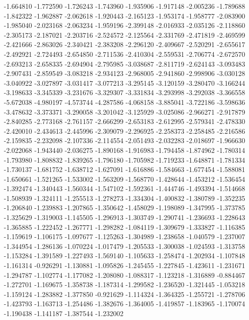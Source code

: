 -1.664810
-1.772590
-1.726243
-1.743960
-1.935906
-1.917148
-2.005236
-1.789688
-1.842322
-1.962887
-2.062618
-1.920443
-2.165123
-1.953174
-1.958777
-2.083900
-1.985040
-2.023168
-2.063234
-1.959196
-2.399148
-2.016933
-2.035126
-2.118860
-2.305173
-2.187021
-2.203716
-2.524572
-2.125564
-2.331769
-2.471819
-2.469599
-2.421666
-2.863026
-2.340421
-2.383208
-2.296120
-2.409667
-2.520291
-2.655617
-2.492921
-2.724493
-2.654850
-2.711536
-2.410304
-2.559531
-2.706774
-2.672570
-2.693213
-2.658335
-2.694904
-2.795985
-3.038687
-2.811719
-2.624143
-3.093483
-2.907431
-2.859549
-3.083218
-2.934123
-2.968005
-2.941860
-2.998906
-3.030128
-3.040922
-3.027897
-3.031417
-3.077213
-3.295145
-3.120159
-3.280470
-3.166244
-3.198633
-3.345339
-3.231676
-3.329307
-3.331834
-3.293998
-3.292038
-3.366558
-5.672038
-4.980197
-4.573744
-4.287586
-4.068158
-3.885041
-3.722186
-3.598636
-3.478632
-3.373371
-3.290058
-3.201042
-3.125929
-3.025086
-2.966271
-2.917879
-2.840285
-2.773168
-2.761157
-2.666299
-2.653183
-2.612995
-2.579341
-2.478330
-2.420010
-2.434613
-2.445996
-2.309079
-2.296925
-2.258373
-2.258485
-2.216586
-2.159835
-2.232098
-2.107336
-2.114554
-2.051493
-2.032283
-2.018697
-1.966630
-2.022068
-1.943440
-2.036275
-1.890168
-1.916983
-1.794458
-1.874962
-1.780314
-1.793980
-1.808832
-1.839265
-1.796180
-1.705982
-1.719233
-1.648871
-1.781334
-1.730137
-1.681752
-1.638712
-1.627091
-1.616886
-1.584663
-1.677454
-1.588081
-1.650661
-1.521265
-1.533002
-1.563209
-1.568770
-1.428644
-1.453212
-1.536454
-1.392474
-1.340443
-1.560344
-1.547102
-1.592361
-1.444746
-1.493394
-1.514668
-1.508939
-1.324111
-1.255513
-1.278273
-1.334304
-1.400832
-1.380789
-1.352235
-1.206840
-1.239883
-1.207865
-1.350642
-1.458029
-1.198089
-1.347995
-1.373785
-1.325629
-1.319003
-1.145505
-1.296913
-1.303749
-1.290741
-1.236693
-1.228643
-1.365885
-1.222452
-1.267771
-1.298282
-1.084119
-1.309679
-1.333827
-1.116385
-1.159619
-1.106175
-1.097677
-1.125263
-1.304989
-1.238658
-1.040579
-1.237007
-1.344954
-1.286136
-1.070224
-1.017479
-1.205533
-1.300038
-1.024593
-1.313758
-1.153284
-1.391589
-1.227493
-1.569140
-1.105633
-1.258474
-1.202934
-1.107848
-1.161314
-0.926291
-1.130881
-1.095826
-1.245455
-1.227845
-1.423611
-1.231671
-1.294787
-1.102774
-1.177082
-1.208080
-1.088317
-1.123218
-1.316889
-0.884467
-1.272701
-1.169675
-1.358738
-1.187314
-1.299582
-1.236520
-1.321445
-1.053218
-1.159124
-1.283882
-1.377850
-0.921629
-1.114324
-1.364325
-1.255721
-1.278706
-1.423793
-1.163713
-1.254486
-1.382676
-1.364005
-1.419857
-1.183965
-1.170074
-1.190438
-1.141187
-1.387544
-1.232002
